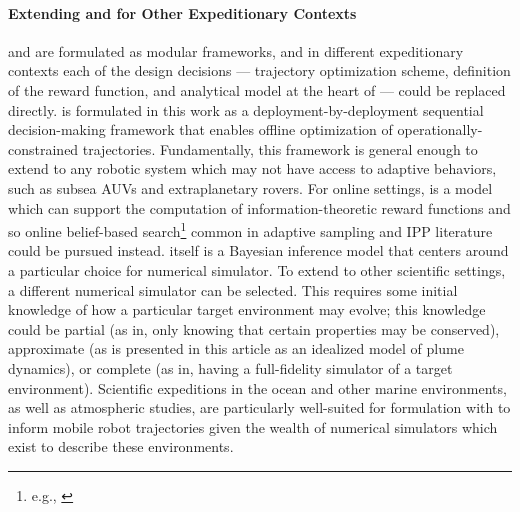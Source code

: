 \paragraph{Extending \PHORTEX and \PHUMES for Other Expeditionary Contexts}
\PHORTEX and \PHUMES are formulated as modular frameworks, and in different expeditionary contexts each of the design decisions --- trajectory optimization scheme, definition of the reward function, and analytical model at the heart of \PHUMES --- could be replaced directly. \PHORTEX is formulated in this work as a deployment-by-deployment sequential decision-making framework that enables offline optimization of operationally-constrained trajectories. Fundamentally, this framework is general enough to extend to any robotic system which may not have access to adaptive behaviors, such as subsea AUVs and extraplanetary rovers. For online settings, \PHUMES is a model which can support the computation of information-theoretic reward functions and so online belief-based search\footnote{e.g., \autocite{flaspohler2019information, Arora2017, Sun2017, sunberg2018online}} common in adaptive sampling and IPP literature could be pursued instead. \PHUMES itself is a Bayesian inference model that centers around a particular choice for numerical simulator. To extend to other scientific settings, a different numerical simulator can be selected. This requires some initial knowledge of how a particular target environment may evolve; this knowledge could be partial (as in, only knowing that certain properties may be conserved), approximate (as is presented in this article as an idealized model of plume dynamics), or complete (as in, having a full-fidelity simulator of a target environment). Scientific expeditions in the ocean and other marine environments, as well as atmospheric studies, are particularly well-suited for formulation with \PHUMES to inform mobile robot trajectories given the wealth of numerical simulators which exist to describe these environments. 

